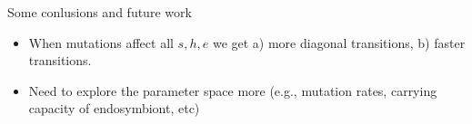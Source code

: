 \documentclass{beamer}
\begin{document}


\begin{frame}{Some conlusions and future work}

\begin{itemize}
  \item When mutations affect all $s,h,e$ we get a) more diagonal transitions, b) faster transitions.
  \medskip
  \medskip
  \item Need to explore the parameter space more (e.g., mutation rates, carrying capacity of endosymbiont, etc)
\end{itemize}

\end{frame}
\end{document}
